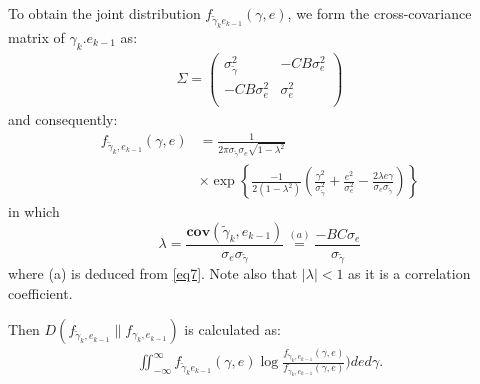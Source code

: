 \documentclass[journal,10pt]{IEEEtran}
\begin{document}
To obtain the joint distribution
$f_{\widetilde{\gamma}_{k}e_{k-1}}(\gamma,e)$, we form the
cross-covariance matrix of $\gamma_{k}.e_{k-1}$ as:
\begin{eqnarray}
\Sigma=
\left(%
\begin{array}{cc}
  \sigma_{\tilde{\gamma}}^{2} & -CB\sigma_{e}^{2} \\
  -CB\sigma_{e}^{2} & \sigma_{e}^{2} \\
\end{array}%
\right)
\end{eqnarray}
and consequently:
\begin{align}
f_{\widetilde{\gamma}_{k}, e_{k-1}}(\gamma,e) & = \frac{1}{2\pi
\sigma_{\tilde{\gamma}}\sigma_{e}\sqrt{1-\lambda^{2}}}
\nonumber \\
& \times \exp \left\{ \frac{-1}{2(1-\lambda^{2})}\left(\frac{\gamma^{2}}{\sigma_{\tilde{\gamma}}^{2}}+\frac{e^{2}}{\sigma_{e}^{2}}-\frac{2\lambda
e\gamma}{\sigma_{e}\sigma_{\tilde{\gamma}}}\right) \right\} \label{attackdis}
\end{align}
in which
\begin{equation}
\lambda=\frac{\textbf{cov}(\tilde{\gamma}_{k},e_{k-1})}{\sigma_{e}\sigma_{\tilde{\gamma}}}\mathop{=}\limits^{(a)}\frac{-BC\sigma_{e}}{\sigma_{\tilde{\gamma}}}
\end{equation}
where (a) is deduced from \eqref{eq7}. Note also that $|\lambda| < 1$ as it is a correlation coefficient.

Then $D(f_{\widetilde{\gamma}_{k}, e_{k-1}} \|f_{\gamma_{k}, e_{k-1}})$ is calculated as:
\begin{eqnarray}
\iint_{-\infty}^{\infty}f_{\widetilde{\gamma}_{k}e_{k-1}}(\gamma,e)\log\frac{f_{\widetilde{\gamma}_{k},e_{k-1}}(\gamma,e)}{f_{\gamma_{k},e_{k-1}}(\gamma,e)})de
d\gamma.\label{eq8}
\end{eqnarray}
\end{document}
